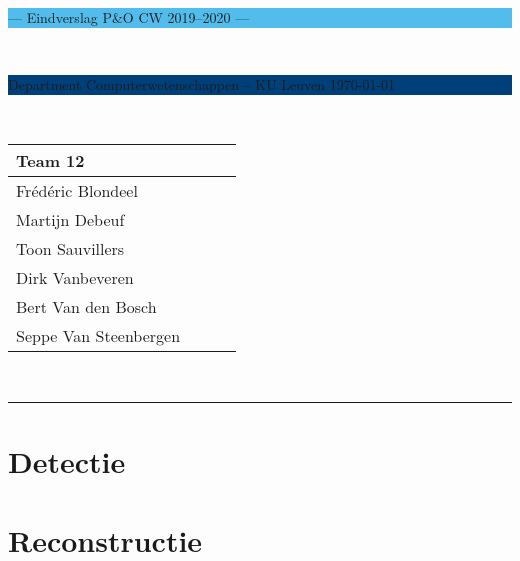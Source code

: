 \documentclass[a4paper,11pt]{article}
\begin{document}
\noindent
\colorbox[HTML]{52BDEC}{\bfseries\parbox{\textwidth}{\centering\large
  --- Eindverslag P\&O CW 2019--2020 --- 
}}
\\[-1mm]
\colorbox[HTML]{00407A}{\bfseries\color{white}\parbox{\textwidth}{
  Department Computerwetenschappen -- KU Leuven
  \hfill
  \today
}}
\\

\smallskip

\noindent

\begin{tabular}{*4l}
\toprule
\multicolumn{2}{l}{\large\textbf{Team 12}} \\
\midrule
Frédéric Blondeel &\\
Martijn Debeuf &\\
Toon Sauvillers &\\ %
Dirk Vanbeveren  &\\
Bert Van den Bosch & \\
Seppe Van Steenbergen &\\


\bottomrule
\hline
\end{tabular}\\

\noindent
{\color[HTML]{52BDEC} \rule{\linewidth}{1mm} }
\tableofcontents
\newpage

\section{Detectie}\label{sec:detectie}


\section{Reconstructie}\label{sec:reconstructie}

	

\newpage


\newpage


\end{document}
